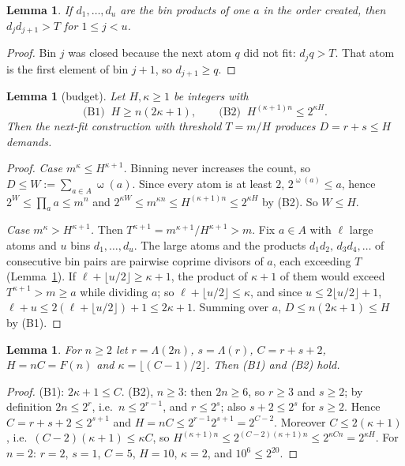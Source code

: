 \documentclass[11pt]{article}
\newtheorem{lemma}[theorem]{Lemma}
\theoremstyle{definition}
\newcommand{\Lam}{\Lambda}
\DeclareMathOperator{\om}{\omega}
\begin{document}
\begin{lemma}\label{lem:nextfit}
If $d_1,\dots,d_u$ are the bin products of one $a$ in the order created, then $d_jd_{j+1}>T$ for $1\le j<u$.
\end{lemma}
\begin{proof}
Bin $j$ was closed because the next atom $q$ did not fit: $d_jq>T$. That atom is the first element of bin
$j+1$, so $d_{j+1}\ge q$.
\end{proof}

\begin{lemma}[budget]\label{lem:budget}
Let $H,\kappa\ge 1$ be integers with
\begin{equation}\label{eq:B}
 \text{(B1)}\;\; H\ge n(2\kappa+1),\qquad\text{(B2)}\;\; H^{(\kappa+1)n}\le 2^{\kappa H}.
\end{equation}
Then the next-fit construction with threshold $T=m/H$ produces $D=r+s\le H$ demands.
\end{lemma}
\begin{proof}
\emph{Case $m^\kappa\le H^{\kappa+1}$.} Binning never increases the count, so $D\le W:=\sum_{a\in A}\om(a)$.
Since every atom is at least $2$, $2^{\om(a)}\le a$, hence $2^W\le\prod_a a\le m^n$ and
$2^{\kappa W}\le m^{\kappa n}\le H^{(\kappa+1)n}\le 2^{\kappa H}$ by (B2). So $W\le H$.

\emph{Case $m^\kappa>H^{\kappa+1}$.} Then $T^{\kappa+1}=m^{\kappa+1}/H^{\kappa+1}>m$. Fix $a\in A$ with
$\ell$ large atoms and $u$ bins $d_1,\dots,d_u$. The large atoms and the products $d_1d_2,\,d_3d_4,\dots$ of
consecutive bin pairs are pairwise coprime divisors of $a$, each exceeding $T$ (Lemma~\ref{lem:nextfit}).
If $\ell+\lfloor u/2\rfloor\ge\kappa+1$, the product of $\kappa+1$ of them would exceed $T^{\kappa+1}>m\ge a$
while dividing $a$; so $\ell+\lfloor u/2\rfloor\le\kappa$, and since $u\le 2\lfloor u/2\rfloor+1$,
$\ell+u\le 2(\ell+\lfloor u/2\rfloor)+1\le 2\kappa+1$. Summing over $a$, $D\le n(2\kappa+1)\le H$ by (B1).
\end{proof}

\begin{lemma}\label{lem:params}
For $n\ge 2$ let $r=\Lam(2n)$, $s=\Lam(r)$, $C=r+s+2$, $H=nC=F(n)$ and $\kappa=\lfloor(C-1)/2\rfloor$. Then
\textup{(B1)} and \textup{(B2)} hold.
\end{lemma}
\begin{proof}
(B1): $2\kappa+1\le C$. (B2), $n\ge 3$: then $2n\ge 6$, so $r\ge 3$ and $s\ge 2$; by definition $2n\le 2^r$,
i.e.\ $n\le 2^{r-1}$, and $r\le 2^s$; also $s+2\le 2^s$ for $s\ge 2$. Hence $C=r+s+2\le 2^{s+1}$ and
$H=nC\le 2^{r-1}2^{s+1}=2^{C-2}$. Moreover $C\le 2(\kappa+1)$, i.e.\ $(C-2)(\kappa+1)\le\kappa C$, so
$H^{(\kappa+1)n}\le 2^{(C-2)(\kappa+1)n}\le 2^{\kappa Cn}=2^{\kappa H}$. For $n=2$: $r=2$, $s=1$, $C=5$,
$H=10$, $\kappa=2$, and $10^6\le 2^{20}$.
\end{proof}
\end{document}

